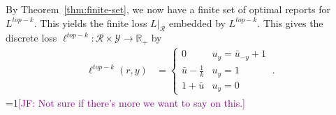 \documentclass[12pt]{article}
\newcommand{\Comments}{1}
\newcommand{\mynote}[2]{\ifnum\Comments=1\textcolor{#1}{#2}\fi}
\newcommand{\jessie}[1]{\mynote{purple}{[JF: #1]}}
\newcommand{\reals}{\mathbb{R}}
\newcommand{\prop}[1]{\Gamma[#1]}
\newcommand{\simplex}{\Delta_\Y}
\newcommand{\R}{\mathcal{R}}
\newcommand{\Y}{\mathcal{Y}}
\newtheorem{conjecture}{Conjecture}
\begin{document}
By Theorem~\ref{thm:finite-set}, we now have a finite set of optimal reports for $L^{top-k}$.
This yields the finite loss $L|_\R$ embedded by $L^{top-k}$.
This gives the discrete loss $\ell^{top-k} : \R \times\Y \to \reals_+$ by
\begin{align}
\ell^{top-k}(r,y) &= \begin{cases}
0 & u_y = \bar u_{-y} + 1\\
\bar u - \frac 1 k & u_y = 1\\
1 + \bar u & u_y = 0
\end{cases}~.~
\end{align}
\jessie{Not sure if there's more we want to say on this.}

\end{document}
